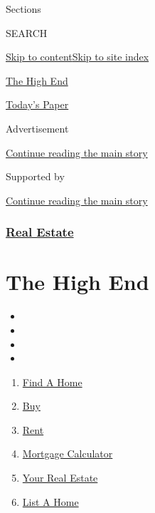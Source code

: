 Sections

SEARCH

\protect\hyperlink{site-content}{Skip to
content}\protect\hyperlink{site-index}{Skip to site index}

\href{https://www.nytimes3xbfgragh.onion/spotlight/thehighend}{The High
End}

\href{https://myaccount.nytimes3xbfgragh.onion/auth/login?response_type=cookie\&client_id=vi}{}

\href{https://www.nytimes3xbfgragh.onion/section/todayspaper}{Today's
Paper}

Advertisement

\protect\hyperlink{after-top}{Continue reading the main story}

Supported by

\protect\hyperlink{after-sponsor}{Continue reading the main story}

\hypertarget{real-estate}{%
\subsubsection{\texorpdfstring{\href{/section/realestate}{Real
Estate}}{Real Estate}}\label{real-estate}}

\hypertarget{the-high-end}{%
\section{The High End}\label{the-high-end}}

\begin{itemize}
\item
\item
\item
\item
\end{itemize}

\begin{enumerate}
\def\labelenumi{\arabic{enumi}.}
\tightlist
\item
  \href{/real-estate/find-a-home}{Find A Home}
\item
  \href{/real-estate/homes-for-sale}{Buy}
\item
  \href{/real-estate/homes-for-rent}{Rent}
\item
  \href{/real-estate/mortgage-calculator}{Mortgage Calculator}
\item
  \href{/real-estate/my-real-estate}{Your Real Estate}
\item
  \href{https://nytimesads.gtspayments.com/}{List A Home}
\end{enumerate}

